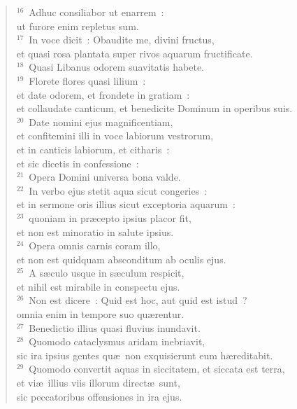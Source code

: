 \begin{flushleft}\begin{verse}${}^{16}$~Adhuc consiliabor ut enarrem~:\\ ut furore enim repletus sum.\\
${}^{17}$~In voce dicit~: Obaudite me, divini fructus,\\ et quasi rosa plantata super rivos aquarum fructificate.\\
${}^{18}$~Quasi Libanus odorem suavitatis habete.\\
${}^{19}$~Florete flores quasi lilium~:\\ et date odorem, et frondete in gratiam~:\\ et collaudate canticum, et benedicite Dominum in operibus suis.\\
${}^{20}$~Date nomini ejus magnificentiam,\\ et confitemini illi in voce labiorum vestrorum,\\ et in canticis labiorum, et citharis~:\\ et sic dicetis in confessione~:\\
${}^{21}$~Opera Domini universa bona valde.\\
${}^{22}$~In verbo ejus stetit aqua sicut congeries~:\\ et in sermone oris illius sicut exceptoria aquarum~:\\
${}^{23}$~quoniam in pr\ae cepto ipsius placor fit,\\ et non est minoratio in salute ipsius.\\
${}^{24}$~Opera omnis carnis coram illo,\\ et non est quidquam absconditum ab oculis ejus.\\
${}^{25}$~A s\ae culo usque in s\ae culum respicit,\\ et nihil est mirabile in conspectu ejus.\\
${}^{26}$~Non est dicere~: Quid est hoc, aut quid est istud~?\\ omnia enim in tempore suo qu\ae rentur.\\
${}^{27}$~Benedictio illius quasi fluvius inundavit.\\
${}^{28}$~Quomodo cataclysmus aridam inebriavit,\\ sic ira ipsius gentes qu\ae\ non exquisierunt eum h\ae reditabit.\\
${}^{29}$~Quomodo convertit aquas in siccitatem, et siccata est terra,\\ et vi\ae\ illius viis illorum direct\ae\ sunt,\\ sic peccatoribus offensiones in ira ejus.\\

\end{verse}
\end{flushleft}
